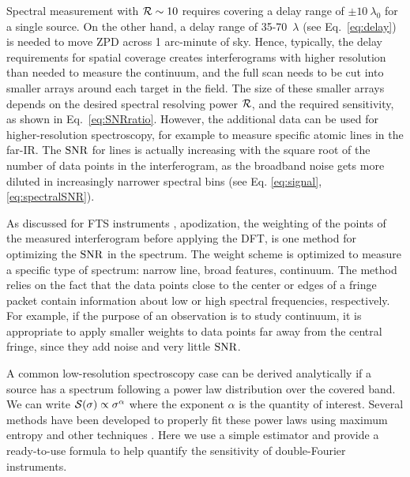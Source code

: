 Spectral measurement with $\mathcal{R}\sim 10$ requires covering a delay range of $\pm 10~\lambda_0$ for a single source. On the other
hand, a delay range of 35-70~$\lambda$ (see Eq.~\ref{eq:delay}) is needed to move ZPD across 1 arc-minute of sky. Hence, typically,
the delay requirements for spatial coverage creates interferograms with higher resolution than needed to measure the continuum, and the full scan needs to be cut into smaller arrays around each target in the field. The size of these smaller arrays depends on the desired spectral resolving power $\mathcal{R}$, and the required sensitivity, as shown in Eq.~\ref{eq:SNRratio}. However, the additional data can be used for higher-resolution spectroscopy, for example to measure specific atomic lines in the far-IR. The $\textrm{SNR}$ for lines is actually increasing with the square root of the number of data points in the interferogram, as the broadband noise gets more diluted in increasingly narrower spectral bins (see Eq. \ref{eq:signal}, \ref{eq:spectralSNR}). 


As discussed for FTS instruments \citep[e.g.][]{Davis:2001tr},
apodization, the weighting of the points of the measured interferogram before applying the DFT, is one method for optimizing the $\textrm{SNR}$
in the spectrum.
 The weight scheme is optimized to measure a specific type of spectrum: narrow line, broad features, continuum. 
The method relies on the fact that the data points close to the center or edges of a fringe packet contain information about low or high spectral frequencies, respectively. For example, if the purpose of an observation is to study continuum, it is appropriate to apply smaller weights to data points far away from the central fringe, since they add noise and very little $\textrm{SNR}$. 

A common low-resolution spectroscopy case can be derived analytically
if a source has a spectrum following a power law distribution over the covered band. We can 
write $\mathcal{S}(\sigma) \propto \sigma^\alpha$ where the exponent $\alpha$ is the quantity of interest. 
Several methods have been developed to properly fit these power laws using maximum entropy and other 
techniques \citep[e.g.][]{Clauset:2007iy}. Here we use a simple estimator and provide 
a ready-to-use formula to help quantify the sensitivity of double-Fourier instruments.

